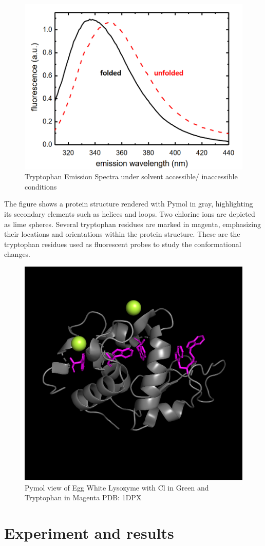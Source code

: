 \documentclass[a4paper,english,12pt,bibliography=totoc]{scrreprt}
\begin{document}
\begin{figure}[H]
    \centering
    \includegraphics[width=0.5\linewidth]{tryptophan.png}
    \caption{Tryptophan Emission Spectra under solvent accessible/ inaccessible conditions \cite{BiophysicsLabCourse}}
\end{figure}

The figure shows a protein structure rendered with Pymol \cite{pymol} in gray, highlighting its secondary elements such as helices and loops. Two chlorine ions are depicted as lime spheres. Several tryptophan residues are marked in magenta, emphasizing their locations and orientations within the protein structure. These are the tryptophan residues used as fluorescent probes to study the conformational changes.

\begin{figure}
    \centering
    \includegraphics[width=0.5\linewidth]{EggWhiteLysozyme1DPX.png}
    \caption{Pymol view of Egg White Lysozyme with Cl in Green and Tryptophan in Magenta PDB: 1DPX \cite{hilgenfeld_crystallization_2000} } 
\end{figure}



\chapter{Experiment and results}
\label{cha:Experiment}
\end{document}
